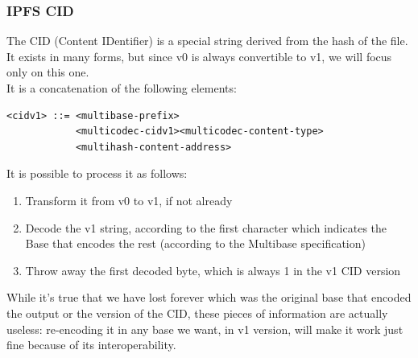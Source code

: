 \documentclass[main.tex]{subfiles}
\begin{document}
\subsubsection{IPFS CID}
The CID (Content IDentifier) is a special string derived from the hash of the file. It exists in many forms, but since v0 is always convertible to v1, we will focus only on this one.\\
It is a concatenation of the following elements:\cite{IPFS_CID_v1_specification}
\begin{verbatim}
<cidv1> ::= <multibase-prefix>
            <multicodec-cidv1><multicodec-content-type>
            <multihash-content-address>
\end{verbatim}
\newpage
It is possible to process it as follows:
\begin{enumerate}
    \item Transform it from v0 to v1, if not already
    \item Decode the v1 string, according to the first character which indicates the Base that encodes the rest (according to the Multibase specification)
    \item Throw away the first decoded byte, which is always 1 in the v1 CID version
\end{enumerate}

While it's true that we have lost forever which was the original base that encoded the output or the version of the CID, these pieces of information are actually useless: re-encoding it in any base we want, in v1 version, will make it work just fine because of its interoperability.
\end{document}
